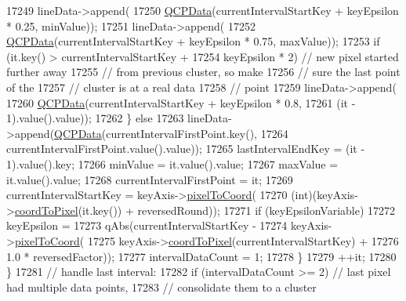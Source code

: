 \begin{DoxyCode}
17249             lineData->append(
17250                 \hyperlink{class_q_c_p_data}{QCPData}(currentIntervalStartKey + keyEpsilon * 0.25, minValue));
17251             lineData->append(
17252                 \hyperlink{class_q_c_p_data}{QCPData}(currentIntervalStartKey + keyEpsilon * 0.75, maxValue));
17253             \textcolor{keywordflow}{if} (it.key() > currentIntervalStartKey +
17254                                keyEpsilon * 2) \textcolor{comment}{// new pixel started further away}
17255                                                \textcolor{comment}{// from previous cluster, so make}
17256                                                \textcolor{comment}{// sure the last point of the}
17257                                                \textcolor{comment}{// cluster is at a real data}
17258                                                \textcolor{comment}{// point}
17259               lineData->append(
17260                   \hyperlink{class_q_c_p_data}{QCPData}(currentIntervalStartKey + keyEpsilon * 0.8,
17261                           (it - 1).value().value));
17262           \} \textcolor{keywordflow}{else}
17263             lineData->append(\hyperlink{class_q_c_p_data}{QCPData}(currentIntervalFirstPoint.key(),
17264                                      currentIntervalFirstPoint.value().value));
17265           lastIntervalEndKey = (it - 1).value().key;
17266           minValue = it.value().value;
17267           maxValue = it.value().value;
17268           currentIntervalFirstPoint = it;
17269           currentIntervalStartKey = keyAxis->\hyperlink{class_q_c_p_axis_ae9289ef7043b9d966af88eaa95b037d1}{pixelToCoord}(
17270               (\textcolor{keywordtype}{int})(keyAxis->\hyperlink{class_q_c_p_axis_a985ae693b842fb0422b4390fe36d299a}{coordToPixel}(it.key()) + reversedRound));
17271           \textcolor{keywordflow}{if} (keyEpsilonVariable)
17272             keyEpsilon =
17273                 qAbs(currentIntervalStartKey -
17274                      keyAxis->\hyperlink{class_q_c_p_axis_ae9289ef7043b9d966af88eaa95b037d1}{pixelToCoord}(
17275                          keyAxis->\hyperlink{class_q_c_p_axis_a985ae693b842fb0422b4390fe36d299a}{coordToPixel}(currentIntervalStartKey) +
17276                          1.0 * reversedFactor));
17277           intervalDataCount = 1;
17278         \}
17279         ++it;
17280       \}
17281       \textcolor{comment}{// handle last interval:}
17282       \textcolor{keywordflow}{if} (intervalDataCount >= 2) \textcolor{comment}{// last pixel had multiple data points,}
17283                                   \textcolor{comment}{// consolidate them to a cluster}

\end{DoxyCode}
